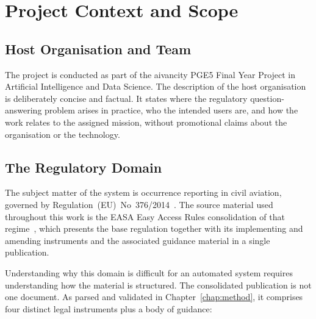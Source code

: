 \chapter{Project Context and Scope}
\label{chap:context}

\section{Host Organisation and Team}
\label{sec:context-org}


The project is conducted as part of the aivancity PGE5 Final Year Project in Artificial Intelligence and Data Science. The description of the host organisation is deliberately concise and factual. It states where the regulatory question-answering problem arises in practice, who the intended users are, and how the work relates to the assigned mission, without promotional claims about the organisation or the technology.

\section{The Regulatory Domain}
\label{sec:context-domain}

The subject matter of the system is occurrence reporting in civil aviation, governed by Regulation~(EU)~No~376/2014~\cite{eu2014reg376}. The source material used throughout this work is the \ac{EASA} Easy Access Rules consolidation of that regime~\cite{easa2022easyaccess376}, which presents the base regulation together with its implementing and amending instruments and the associated guidance material in a single publication.

Understanding why this domain is difficult for an automated system requires understanding how the material is structured. The consolidated publication is not one document. As parsed and validated in Chapter~\ref{chap:method}, it comprises four distinct legal instruments plus a body of guidance:


